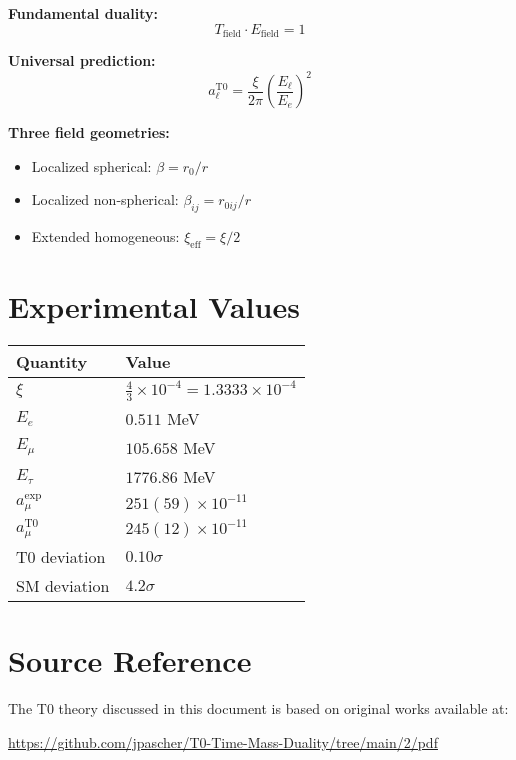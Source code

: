 \documentclass[12pt,a4paper]{report}
\newcommand{\rzero}{r_0}                  %
\begin{document}
\textbf{Fundamental duality:}
\begin{equation}
	T_{\text{field}} \cdot E_{\text{field}} = 1
\end{equation}

\textbf{Universal prediction:}
\begin{equation}
	a_\ell^{\text{T0}} = \frac{\xi}{2\pi} \left(\frac{E_\ell}{E_e}\right)^2
\end{equation}

\textbf{Three field geometries:}
\begin{itemize}
	\item Localized spherical: $\beta = \rzero/r$
	\item Localized non-spherical: $\beta_{ij} = r_{0ij}/r$
	\item Extended homogeneous: $\xi_{\text{eff}} = \xi/2$
\end{itemize}

\section{Experimental Values}
\label{sec:experimental_values}

\begin{longtable}{|l|l|}
	\hline
	\textbf{Quantity} & \textbf{Value} \\
	\hline
	$\xi$ & $\frac{4}{3} \times 10^{-4} = 1.3333 \times 10^{-4}$ \\
	$E_e$ & $0.511$ MeV \\
	$E_\mu$ & $105.658$ MeV \\
	$E_\tau$ & $1776.86$ MeV \\
	$a_\mu^{\text{exp}}$ & $251(59) \times 10^{-11}$ \\
	$a_\mu^{\text{T0}}$ & $245(12) \times 10^{-11}$ \\
	T0 deviation & $0.10\sigma$ \\
	SM deviation & $4.2\sigma$ \\
	\hline
\end{longtable}

\section{Source Reference}
\label{sec:source_reference}

The T0 theory discussed in this document is based on original works available at:

\begin{center}
	\url{https://github.com/jpascher/T0-Time-Mass-Duality/tree/main/2/pdf}
\end{center}
\end{document}
